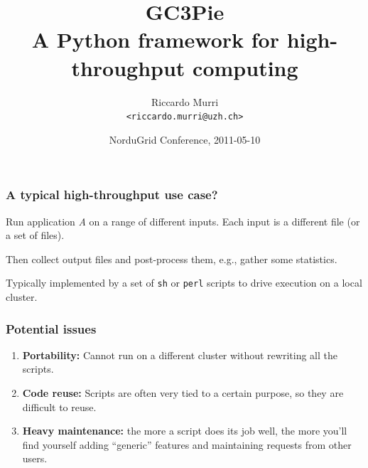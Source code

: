 \documentclass[presentation]{beamer}
\begin{document}
\title[GC3Pie]{%
  \textbf{GC3Pie} 
  \\ 
  A Python framework for high-throughput computing
}
\author[R.\ Murri]
{Riccardo Murri \\ \texttt{<riccardo.murri@uzh.ch>}}
\date[NG2011]{NorduGrid Conference, 2011-05-10}
\maketitle

\logo{}

\begin{frame}
\frametitle{A typical high-throughput use case?}
\label{sec:1}
  Run application \emph{A} on a range of different inputs.
  Each input is a different file (or a set of files).

  Then collect output files and post-process them, e.g., gather some
  statistics.

  Typically implemented by a set of \texttt{sh} or \texttt{perl}
  scripts to drive execution on a local cluster.
\end{frame}

\begin{frame}
  \frametitle{Potential issues}
  \label{sec:2}

  \begin{enumerate}
  \item \textbf{Portability:} Cannot run on a different cluster without rewriting
    all the scripts.
  \item \textbf{Code reuse:} Scripts are often very tied to a certain purpose, so
    they are difficult to reuse.
  \item \textbf{Heavy maintenance:} the more a script does its job well, the more
    you'll find yourself adding ``generic'' features and maintaining
    requests from other users.
  \end{enumerate}
\end{frame}
\end{document}
